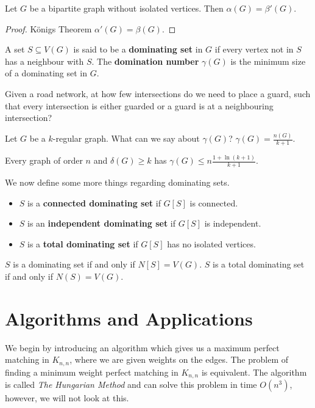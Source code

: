 \begin{corollary}
	Let $G$ be a bipartite graph without isolated vertices. Then $\alpha(G) = \beta'(G)$.
\end{corollary}

\begin{proof}
	Königs Theorem \(\alpha'(G) = \beta(G)\).
\end{proof}

A set $S \subseteq V(G)$ is said to be a \textbf{dominating set} in $G$ if every vertex not in $S$ has a neighbour with $S$. The \textbf{domination number} \(\gamma(G)\) is the minimum size of a dominating set in $G$.

\begin{example}
	Given a road network, at how few intersections do we need to place a guard, such that every intersection is either guarded or a guard is at a neighbouring intersection?
\end{example}

Let $G$ be a $k$-regular graph. What can we say about \(\gamma(G)\)? \(\gamma(G) = \frac{n(G)}{k+1}\).

\begin{theorem}
	Every graph of order $n$ and \(\delta(G) \ge k\) has \(\gamma(G) \le n \frac{1+ \ln (k+1)}{k+1}\).
\end{theorem}

We now define some more things regarding dominating sets.
\begin{itemize}
	\item $S$ is a \textbf{connected dominating set} if $G[S]$ is connected.
	\item $S$ is an \textbf{independent dominating set} if $G[S]$ is independent.
	\item $S$ is a \textbf{total dominating set} if $G[S]$ has no isolated vertices.
\end{itemize}

$S$ is a dominating set if and only if $N[S] = V(G)$. $S$ is a total dominating set if and only if $N(S) = V(G)$.

\section{Algorithms and Applications}%
\label{sec:3.2}

We begin by introducing an algorithm which gives us a maximum perfect matching in $K_{n,n}$, where we are given weights on the edges. The problem of finding a minimum weight perfect matching in $K_{n,n}$ is equivalent. The algorithm is called \textit{The Hungarian Method} and can solve this problem in time $O(n^{3})$, however, we will not look at this.

